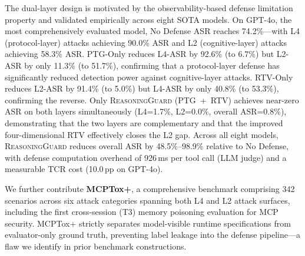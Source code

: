 The dual-layer design is motivated by the observability-based defense limitation property and validated empirically across eight SOTA models.
On GPT-4o, the most comprehensively evaluated model, No Defense ASR reaches 74.2\%---with L4 (protocol-layer) attacks achieving 90.0\% ASR and L2 (cognitive-layer) attacks achieving 58.3\% ASR.
PTG-Only reduces L4-ASR by 92.6\% (to 6.7\%) but L2-ASR by only 11.3\% (to 51.7\%), confirming that a protocol-layer defense has significantly reduced detection power against cognitive-layer attacks.
RTV-Only reduces L2-ASR by 91.4\% (to 5.0\%) but L4-ASR by only 40.8\% (to 53.3\%), confirming the reverse.
Only \textsc{ReasoningGuard} (PTG~+~RTV) achieves near-zero ASR on both layers simultaneously (L4=1.7\%, L2=0.0\%, overall ASR=0.8\%), demonstrating that the two layers are complementary and that the improved four-dimensional RTV effectively closes the L2 gap.
Across all eight models, \textsc{ReasoningGuard} reduces overall ASR by 48.5\%--98.9\% relative to No Defense, with defense computation overhead of 926\,ms per tool call (LLM judge) and a measurable TCR cost (10.0\,pp on GPT-4o).

We further contribute \textbf{MCPTox+}, a comprehensive benchmark comprising 342 scenarios across six attack categories spanning both L4 and L2 attack surfaces, including the first cross-session (T3) memory poisoning evaluation for MCP security. MCPTox+ strictly separates model-visible runtime specifications from evaluator-only ground truth, preventing label leakage into the defense pipeline---a flaw we identify in prior benchmark constructions.

